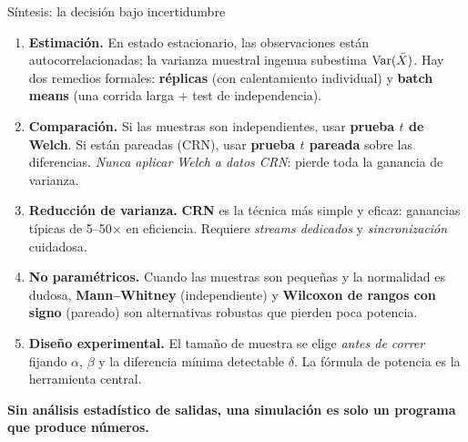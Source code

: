 \documentclass[aspectratio=1610, 10pt]{beamer}
\begin{document}
\begin{frame}{Síntesis: la decisión bajo incertidumbre}
\begin{enumerate}
\item \textbf{Estimación.} En estado estacionario, las observaciones están autocorrelacionadas; la varianza muestral ingenua subestima $\operatorname{Var}(\bar X)$. Hay dos remedios formales: \textbf{réplicas} (con calentamiento individual) y \textbf{batch means} (una corrida larga + test de independencia).

\item \textbf{Comparación.} Si las muestras son independientes, usar \textbf{prueba $t$ de Welch}. Si están pareadas (CRN), usar \textbf{prueba $t$ pareada} sobre las diferencias. \emph{Nunca aplicar Welch a datos CRN}: pierde toda la ganancia de varianza.

\item \textbf{Reducción de varianza.} \textbf{CRN} es la técnica más simple y eficaz: ganancias típicas de 5--50$\times$ en eficiencia. Requiere \emph{streams dedicados} y \emph{sincronización} cuidadosa.

\item \textbf{No paramétricos.} Cuando las muestras son pequeñas y la normalidad es dudosa, \textbf{Mann--Whitney} (independiente) y \textbf{Wilcoxon de rangos con signo} (pareado) son alternativas robustas que pierden poca potencia.

\item \textbf{Diseño experimental.} El tamaño de muestra se elige \emph{antes de correr} fijando $\alpha$, $\beta$ y la diferencia mínima detectable $\delta$. La fórmula de potencia es la herramienta central.
\end{enumerate}

\vspace{0.3cm}
\begin{center}
\textcolor{mobiblue}{\large\textbf{Sin análisis estadístico de salidas, una simulación es solo un programa que produce números.}}
\end{center}
\end{frame}
\end{document}
